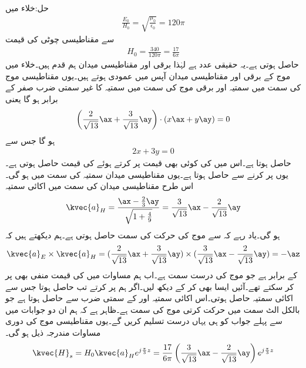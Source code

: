 حل:خلاء میں
\begin{align*}
\frac{E_0}{H_0}=\sqrt{\frac{\mu_0}{\epsilon_0}} =120\pi
\end{align*} 
سے مقناطیسی چوٹی کی قیمت 
\begin{align*}
H_0=\frac{340}{120\pi}=\frac{17}{6\pi}
\end{align*}
حاصل ہوتی ہے۔یہ حقیقی عدد ہے لہٰذا برقی اور مقناطیسی میدان ہم قدم ہیں۔خلاء میں موج کے برقی اور مقناطیسی میدان آپس میں عمودی ہوتے ہیں۔یوں مقناطیسی موج کی سمت میں سمتیہ  اور  برقی موج کی سمت میں سمتیہ  کا غیر سمتی ضرب صفر کے برابر ہو گا یعنی
\begin{align*}
\left(\frac{2}{\sqrt{13}}\ax+\frac{3}{\sqrt{13}}\ay\right) \cdot (x \ax+y \ay)=0
\end{align*}
ہو گا جس سے
\begin{align}\label{مساوات_مستوی_موج_برقی_مقناطیسی_عمودی_اکائی}
2x+3y=0
\end{align}
حاصل ہوتا ہے۔اس میں  کی کوئی بھی قیمت پر کرتے ہوئے  کی قیمت حاصل ہوتی ہے۔یوں  پر کرنے سے  حاصل ہوتا ہے۔یوں مقناطیسی میدان   سمتیہ کی سمت میں ہو گی۔ اس طرح مقناطیسی میدان کی سمت میں اکائی سمتیہ
\begin{align*}
\kvec{a}_H=\frac{\ax-\frac{2}{3}\ay}{\sqrt{1+\frac{4}{9}}}=\frac{3}{\sqrt{13}}\ax-\frac{2}{\sqrt{13}}\ay
\end{align*}
ہو گی۔یاد رہے کہ  سے موج کی حرکت کی سمت حاصل ہوتی ہے۔ہم دیکھتے ہیں کہ
\begin{align*}
\kvec{a}_E \times \kvec{a}_H=(\frac{2}{\sqrt{13}}\ax+\frac{3}{\sqrt{13}}\ay) \times (\frac{3}{\sqrt{13}}\ax-\frac{2}{\sqrt{13}}\ay)=-\az
\end{align*}
کے برابر ہے جو موج کی درست سمت ہے۔اب ہم مساوات  میں  کی قیمت منفی بھی پر کر سکتے تھے۔آئیں ایسا بھی کر کے دیکھ لیں۔اگر ہم  پر کرتے تب  حاصل ہوتا جس سے اکائی سمتیہ   حاصل ہوتی۔اس اکائی سمتیہ اور  کے سمتی ضرب سے  حاصل ہوتا ہے جو بالکل الٹ سمت میں حرکت کرتی موج کی سمت ہے۔ظاہر ہے کہ ہم ان دو جوابات میں سے پہلے جواب کو ہی یہاں درست تسلیم کریں گے۔یوں مقناطیسی موج کی دوری مساوات مندرجہ ذیل ہو گی۔
\begin{align*}
\kvec{H}_s=H_0 \kvec{a}_H e^{j\frac{\pi}{3} z}=\frac{17}{6\pi} \left(\frac{3}{\sqrt{13}}\ax-\frac{2}{\sqrt{13}}\ay \right)e^{j\frac{\pi}{3} z}
\end{align*}
 
